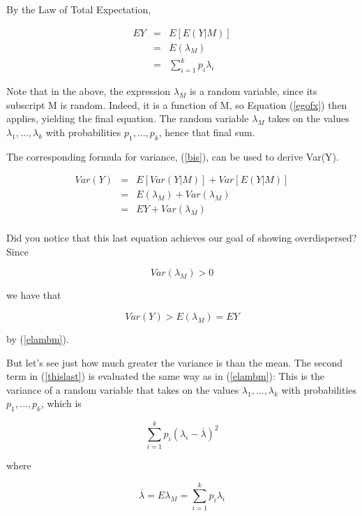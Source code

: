 By the Law of Total Expectation,

\begin{eqnarray}
\label{meanlamb}
EY &=& E[E(Y|M)] \\ 
&=& E(\lambda_M) \label{elambm} \\
&=& \sum_{i=1}^k p_i \lambda_i
\end{eqnarray}

Note that in the above, the expression $\lambda_M$ is a random variable,
since its subscript M is random.  Indeed, it is a function of M, so
Equation (\ref{egofx}) then applies, yielding the final equation.  The
random variable $\lambda_M$ takes on the values $\lambda_1,...,\lambda_k$
with probabilities $p_1,...,p_k$, hence that final sum.

The corresponding formula for variance, (\ref{bis}), can be used to
derive Var(Y).

\begin{eqnarray}
Var(Y) &=& E[Var(Y|M)] + Var[E(Y|M)] \\ 
&=& E(\lambda_M) + Var(\lambda_M) \label{thislast} \\
&=& EY + Var(\lambda_M) \label{thislast} \\
\end{eqnarray}

Did you notice that this last equation achieves our goal of showing
overdispersed?  Since

\begin{equation}
Var(\lambda_M) > 0
\end{equation}

we have that

\begin{equation}
Var(Y) > E(\lambda_M) = EY
\end{equation}

by (\ref{elambm}).

But let's see just how much greater the variance is than the mean.  The
second term in (\ref{thislast}) is evaluated the same way as in
(\ref{elambm}):  This is the variance of a random variable that takes on
the values $\lambda_1,...,\lambda_k$ with probabilities $p_1,...,p_k$,
which is

\begin{equation}
\sum_{i=1}^k p_i (\lambda_i - \overline{\lambda})^2
\end{equation}

where 

\begin{equation}
\overline{\lambda} =  E\lambda_M = \sum_{i=1}^k p_i \lambda_i
\end{equation}

